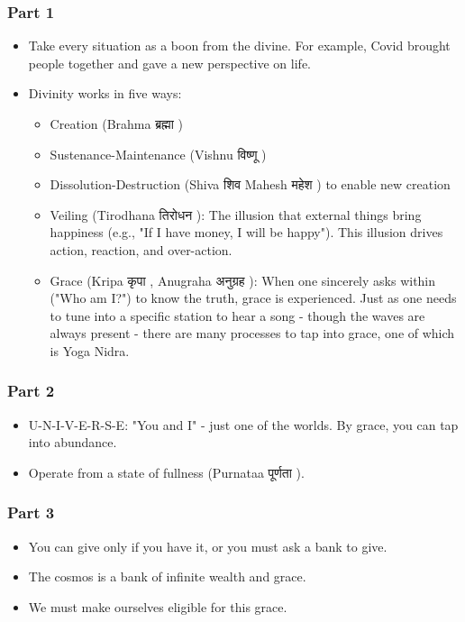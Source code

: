 \begin{frame}[fragile]\frametitle{Part 1}

\begin{itemize}
    \item Take every situation as a boon from the divine. For example, Covid brought people together and gave a new perspective on life.
    \item Divinity works in five ways:
    \begin{itemize}
        \item Creation (Brahma ब्रह्मा )
        \item Sustenance-Maintenance (Vishnu विष्णू )
        \item Dissolution-Destruction (Shiva शिव  Mahesh महेश ) to enable new creation
        \item Veiling (Tirodhana तिरोधन ): The illusion that external things bring happiness (e.g., "If I have money, I will be happy"). This illusion drives action, reaction, and over-action.
        \item Grace (Kripa कृपा , Anugraha अनुग्रह ): When one sincerely asks within ("Who am I?") to know the truth, grace is experienced. Just as one needs to tune into a specific station to hear a song - though the waves are always present - there are many processes to tap into grace, one of which is Yoga Nidra.
    \end{itemize}
\end{itemize}

\end{frame}

\begin{frame}[fragile]\frametitle{Part 2}

\begin{itemize}
    \item U-N-I-V-E-R-S-E: "You and I" - just one of the worlds. By grace, you can tap into abundance.
    \item Operate from a state of fullness (Purnataa पूर्णता ).
\end{itemize}

\end{frame}

\begin{frame}[fragile]\frametitle{Part 3}

\begin{itemize}
    \item You can give only if you have it, or you must ask a bank to give.
    \item The cosmos is a bank of infinite wealth and grace.
    \item We must make ourselves eligible for this grace.
\end{itemize}

\end{frame}

